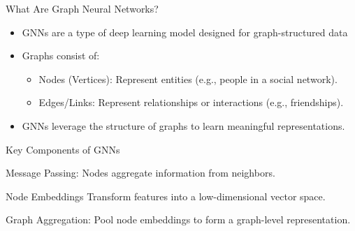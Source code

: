 \documentclass{beamer}
\begin{document}
\begin{frame}{What Are Graph Neural Networks?}
    \begin{itemize}
        \item GNNs are a type of deep learning model designed for graph-structured data
        \item Graphs consist of:
                \begin{itemize}
                \item Nodes (Vertices): Represent entities (e.g., people in a social network).
                \item Edges/Links: Represent relationships or interactions (e.g., friendships).
                
                \vspace{0.3cm}
                \centering %
                \end{itemize}
        \item GNNs leverage the structure of graphs to learn meaningful representations.   
    \end{itemize}
    
\end{frame}

\begin{frame}{Key Components of GNNs}
    \begin{block}{Message Passing:}
        Nodes aggregate information from neighbors.
    \end{block}

    \begin{block}{Node Embeddings}
        Transform features into a low-dimensional vector space.
    \end{block}

    \begin{block}{Graph Aggregation:}
        Pool node embeddings to form a graph-level representation.
    \end{block}
    
\end{frame}
\end{document}
